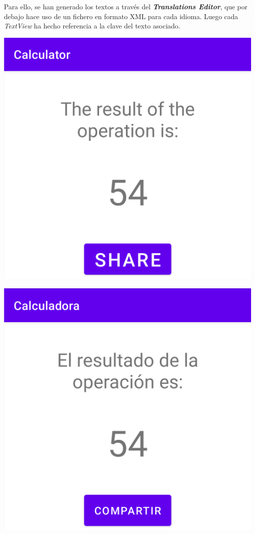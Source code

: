 \documentclass{\ClassPath/viu-tfm-template}
\begin{document}
Para ello, se han generado los textos a través del \textit{\textbf{Translations Editor}}, que por debajo hace uso de un fichero en formato XML para cada idioma. Luego cada \textit{TextView} ha hecho referencia a la clave del texto asociado.

{
\begin{minipage}{0.32\linewidth}
    \includegraphics[frame,width=\linewidth]{img/english.png}
\end{minipage}
\hfill
\begin{minipage}{0.32\linewidth}
    \includegraphics[frame,width=\linewidth]{img/castellano.png}

\end{minipage}}
\end{document}
